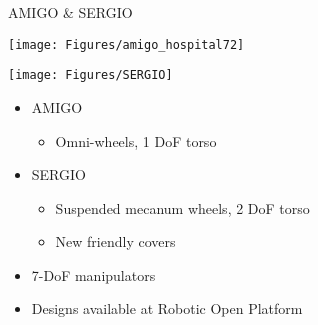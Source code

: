 \documentclass[12pt,a4paper]{article}
\newcommand{\emptylogo}{\texttt{[image: Figures/Empty]}}
\begin{document}
\begin{slidetop}


\begin{multicols}{2}

\begin{bclogo}[couleur = white, arrondi = 0.25, couleurBord = tuedarkblue , barre = none, logo=\emptylogo]{\textcolor{tuedarkblue}{AMIGO \& SERGIO}}
\medskip %
\begin{minipage}[T]{0.48\linewidth}
	\begin{center}
		\texttt{[image: Figures/amigo\_hospital72]}
	\end{center}
\end{minipage}
\hfill
\begin{minipage}[T]{0.48\linewidth}
    \begin{center}
    	\texttt{[image: Figures/SERGIO]}
    \end{center}
\end{minipage}
    \begin{itemize}[itemsep = 0pt, parsep = 0pt, leftmargin=15pt]
    	\item AMIGO
    	\begin{itemize}[itemsep = 0pt, parsep = 0pt, leftmargin=15pt]
    		\item Omni-wheels, 1 DoF torso
    	\end{itemize}
    	\item SERGIO
    	\begin{itemize}[itemsep = 0pt, parsep = 0pt, leftmargin=15pt]
    		\item Suspended mecanum wheels, 2 DoF torso
            \item New friendly covers
    	\end{itemize}
        \item 7-DoF manipulators
        \item Designs available at Robotic Open Platform
    \end{itemize}
\end{bclogo}

\vspace{-0.8cm} %


\end{multicols}
\end{slidetop}
\end{document}
